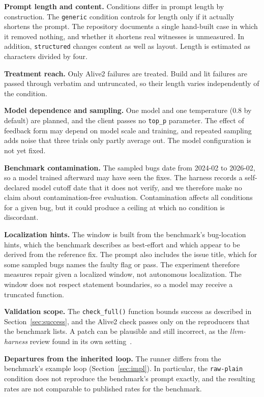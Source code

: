 \documentclass[conference]{IEEEtran}
\newcommand{\cn}[1]{\texttt{#1}}   %
\begin{document}
\textbf{Prompt length and content.} Conditions differ in prompt length by construction. The \cn{generic} condition controls for length only if it actually shortens the prompt. The repository documents a single hand-built case in which it removed nothing, and whether it shortens real witnesses is unmeasured. In addition, \cn{structured} changes content as well as layout. Length is estimated as characters divided by four.

\textbf{Treatment reach.} Only Alive2 failures are treated. Build and lit failures are passed through verbatim and untruncated, so their length varies independently of the condition.

\textbf{Model dependence and sampling.} One model and one temperature (0.8 by default) are planned, and the client passes no \texttt{top\_p} parameter. The effect of feedback form may depend on model scale and training, and repeated sampling adds noise that three trials only partly average out. The model configuration is not yet fixed.

\textbf{Benchmark contamination.} The sampled bugs date from 2024-02 to 2026-02, so a model trained afterward may have seen the fixes. The harness records a self-declared model cutoff date that it does not verify, and we therefore make no claim about contamination-free evaluation. Contamination affects all conditions for a given bug, but it could produce a ceiling at which no condition is discordant.

\textbf{Localization hints.} The window is built from the benchmark's bug-location hints, which the benchmark describes as best-effort and which appear to be derived from the reference fix. The prompt also includes the issue title, which for some sampled bugs names the faulty flag or pass. The experiment therefore measures repair given a localized window, not autonomous localization. The window does not respect statement boundaries, so a model may receive a truncated function.

\textbf{Validation scope.} The \texttt{check\_full()} function bounds success as described in Section~\ref{sec:success}, and the Alive2 check passes only on the reproducers that the benchmark lists. A patch can be plausible and still incorrect, as the \emph{llvm-harness} review found in its own setting~\cite{zheng2026harness}.

\textbf{Departures from the inherited loop.} The runner differs from the benchmark's example loop (Section~\ref{sec:impl}). In particular, the \cn{raw-plain} condition does not reproduce the benchmark's prompt exactly, and the resulting rates are not comparable to published rates for the benchmark.
\end{document}
